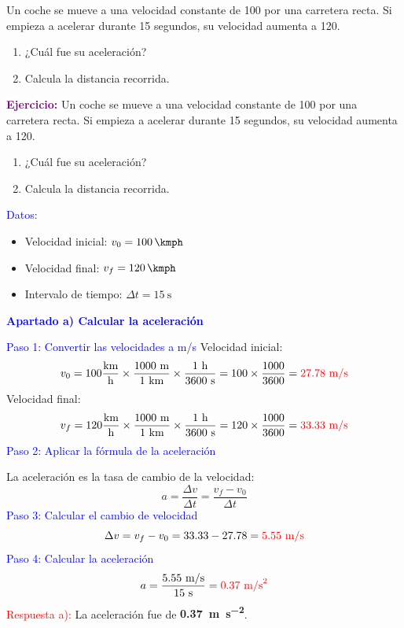 \begin{exercise}
    Un coche se mueve a una velocidad constante de \qty{100}{\kmph} por una carretera recta. Si empieza a acelerar durante 15 segundos, su velocidad aumenta a \qty{120}{\kmph}.
    \begin{enumerate}[label=\letraminuscula]
    \item ¿Cuál fue su aceleración?
    \item Calcula la distancia recorrida.
    \end{enumerate}
    \begin{solu}
        \textbf{\textcolor{purple}{Ejercicio:}}
        Un coche se mueve a una velocidad constante de \qty{100}{\kmph} por una carretera recta.
        Si empieza a acelerar durante 15 segundos, su velocidad aumenta a \qty{120}{\kmph}.
        \begin{enumerate}[label=\letraminuscula]
    \item ¿Cuál fue su aceleración?
    \item Calcula la distancia recorrida.
        \end{enumerate}

        \vspace{0.3cm}

        \textcolor{blue}{Datos:}
        \begin{itemize}
            \item Velocidad inicial: $v_0 = \qty{100}{\kmph}$
            \item Velocidad final: $v_f = \qty{120}{\kmph}$
            \item Intervalo de tiempo: $\Delta t = \qty{15}{\s}$
        \end{itemize}

        \textbf{\textcolor{blue}{Apartado a) Calcular la aceleración}}

        \textcolor{blue}{Paso 1: Convertir las velocidades a m/s}
        Velocidad inicial:
        \[
            v_0 = 100 \frac{\text{km}}{\text{h}} \times \frac{1000 \text{ m}}{1 \text{ km}} \times \frac{1 \text{ h}}{3600 \text{ s}} = 100 \times \frac{1000}{3600} = \textcolor{red}{27.78 \text{ m/s}}
        \]
        Velocidad final:
        \[
            v_f = 120 \frac{\text{km}}{\text{h}} \times \frac{1000 \text{ m}}{1 \text{ km}} \times \frac{1 \text{ h}}{3600 \text{ s}} = 120 \times \frac{1000}{3600} = \textcolor{red}{33.33 \text{ m/s}}
        \]
        \textcolor{blue}{Paso 2: Aplicar la fórmula de la aceleración}

        La aceleración es la tasa de cambio de la velocidad:
        \[
            \boxed{a = \frac{\Delta v}{\Delta t} = \frac{v_f - v_0}{\Delta t}}
        \]
        \textcolor{blue}{Paso 3: Calcular el cambio de velocidad}
        \[
            \Delta v = v_f - v_0 = 33.33 - 27.78 = \textcolor{red}{5.55 \text{ m/s}}
        \]
        \textcolor{blue}{Paso 4: Calcular la aceleración}
        \[
            a = \frac{5.55 \text{ m/s}}{15 \text{ s}} = \textcolor{red}{0.37 \text{ m/s}^2}
        \]
        \textcolor{red}{Respuesta a):} La aceleración fue de \textbf{\qty{0.37}{\metre\per\second\squared}}.


\end{solu}
\end{exercise}
